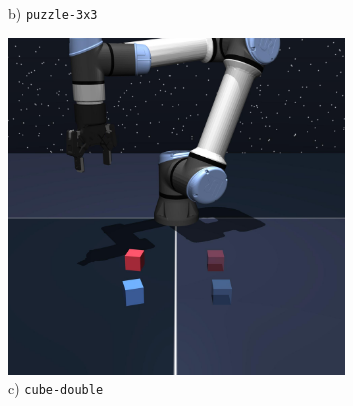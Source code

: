 \begin{figure}[t]
\begin{minipage}{0.24\textwidth}
\begin{subfigure}{\textwidth}
            \caption{\footnotesize b) \texttt{puzzle-3x3}}
            \label{fig:puzzle-viz}
        \end{subfigure}
    \end{minipage}\hfill    
    \begin{minipage}{0.24\textwidth}
        \begin{subfigure}{\textwidth}
            \centering
            \includegraphics[width=0.98\textwidth]{figures/renders/cube-double-play-singletask-task2-v0.jpeg}
            \caption{\footnotesize c) \texttt{cube-double}}
            \label{fig:cube-double-viz}
        \end{subfigure}
    \end{minipage}\hfill
    \begin{minipage}{0.24\textwidth}
        \begin{subfigure}{\textwidth}
            \centering

\end{subfigure}
\end{minipage}
\end{figure}
